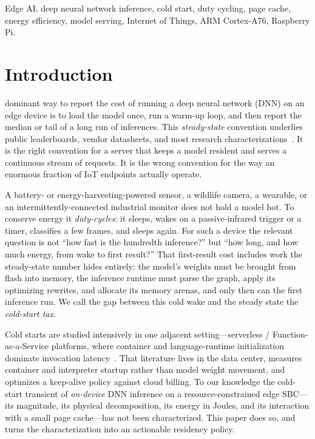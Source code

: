 \documentclass[journal]{IEEEtran}
\begin{document}
\begin{IEEEkeywords}
Edge AI, deep neural network inference, cold start, duty cycling, page cache, energy efficiency,
model serving, Internet of Things, ARM Cortex-A76, Raspberry Pi.
\end{IEEEkeywords}

\section{Introduction}
 dominant way to report the cost of running a deep neural network (DNN) on an
edge device is to load the model once, run a warm-up loop, and then report the median or tail of
a long run of inferences. This \emph{steady-state} convention underlies public leaderboards,
vendor datasheets, and most research characterizations~\cite{reddi2020mlperf,bianco2018benchmark}.
It is the right convention for a server that keeps a model resident and serves a continuous
stream of requests. It is the wrong convention for the way an enormous fraction of IoT endpoints
actually operate.

A battery- or energy-harvesting-powered sensor, a wildlife camera, a wearable, or an
intermittently-connected industrial monitor does not hold a model hot. To conserve energy it
\emph{duty-cycles}: it sleeps, wakes on a passive-infrared trigger or a timer, classifies a few
frames, and sleeps again. For such a device the relevant question is not ``how fast is the
hundredth inference?'' but ``how long, and how much energy, from wake to first result?'' That
first-result cost includes work the steady-state number hides entirely: the model's weights must
be brought from flash into memory, the inference runtime must parse the graph, apply its
optimizing rewrites, and allocate its memory arenas, and only then can the first inference run.
We call the gap between this cold wake and the steady state the \emph{cold-start tax}.

Cold starts are studied intensively in one adjacent setting---serverless / Function-as-a-Service
platforms, where container and language-runtime initialization dominate invocation
latency~\cite{wang2018peeking,shahrad2020serverless,fuerst2021faascache}. That literature lives
in the data center, measures container and interpreter startup rather than model weight movement,
and optimizes a keep-alive policy against cloud billing. To our knowledge the cold-start
transient of \emph{on-device} DNN inference on a resource-constrained edge SBC---its magnitude,
its physical decomposition, its energy in Joules, and its interaction with a small page
cache---has not been characterized. This paper does so, and turns the characterization into an
actionable residency policy.
\end{document}
